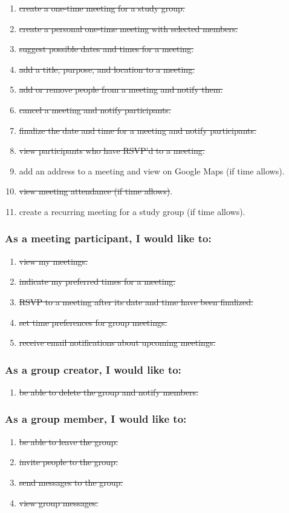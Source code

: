 \documentclass[12pt]{article}
\begin{document}
\begin{enumerate}[nolistsep]
    \item \st{create a one-time meeting for a study group.}
    \item \st{create a personal one-time meeting with selected members.}
    \item \st{suggest possible dates and times for a meeting.}
    \item \st{add a title, purpose, and location to a meeting.}
    \item \st{add or remove people from a meeting and notify them.}
    \item \st{cancel a meeting and notify participants.}
    \item \st{finalize the date and time for a meeting and notify participants.}
    \item \st{view participants who have RSVP'd to a meeting.}
    \item add an address to a meeting and view on Google Maps (if time allows).
    \item \st{view meeting attendance (if time allows)}.
    \item create a recurring meeting for a study group (if time allows).
\end{enumerate}

\subsubsection*{As a meeting participant, I would like to:}

\begin{enumerate}[nolistsep]
    \item \st{view my meetings.}
    \item \st{indicate my preferred times for a meeting.}
    \item \st{RSVP to a meeting after its date and time have been finalized.}
    \item \st{set time preferences for group meetings.}
    \item \st{receive email notifications about upcoming meetings.}
\end{enumerate}

\subsubsection*{As a group creator, I would like to:}
\begin{enumerate}[nolistsep]
    \item \st{be able to delete the group and notify members.}
\end{enumerate}

\subsubsection*{As a group member, I would like to:}
\begin{enumerate}[nolistsep]
    \item \st{be able to leave the group.}
    \item \st{invite people to the group.}
    \item \st{send messages to the group.}
    \item \st{view group messages.}
\end{enumerate}
\end{document}
